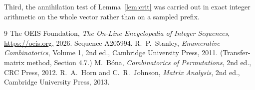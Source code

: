 \documentclass[11pt,a4paper]{article}
\theoremstyle{plain}
\theoremstyle{definition}
\begin{document}
Third, the annihilation test of Lemma~\ref{lem:crit} was carried out in exact integer
arithmetic on the whole vector rather than on a sampled prefix.

\begin{thebibliography}{9}
 The OEIS Foundation, \emph{The On-Line Encyclopedia of Integer
Sequences}, \url{https://oeis.org}, 2026. Sequence A205994.
 R.~P.~Stanley, \emph{Enumerative Combinatorics}, Volume 1, 2nd ed.,
Cambridge University Press, 2011. (Transfer-matrix method, Section 4.7.)
 M.~B\'ona, \emph{Combinatorics of Permutations}, 2nd ed., CRC
Press, 2012.
 R.~A.~Horn and C.~R.~Johnson, \emph{Matrix Analysis}, 2nd ed., Cambridge
University Press, 2013.
\end{thebibliography}
\end{document}

